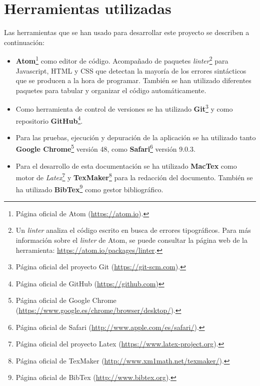 \section{Herramientas utilizadas}
\label{sec:herramientas}

Las herramientas que se han usado para desarrollar este proyecto se describen a continuación:

\begin{itemize}
	\item \textbf{Atom}\footnote{Página oficial de Atom (\url{https://atom.io}).} como editor de código. Acompañado de paquetes \emph{linter}\footnote{Un \emph{linter} analiza el código escrito en busca de errores tipográficos. Para más información sobre el \emph{linter} de Atom, se puede consultar la página web de la herramienta: \url{https://atom.io/packages/linter}.} para Javascript, HTML y CSS que detectan la mayoría de los errores sintácticos que se producen a la hora de programar. También se han utilizado diferentes paquetes para tabular y organizar el código automáticamente. 

	\item Como herramienta de control de versiones se ha utilizado \textbf{Git}\footnote{Página oficial del proyecto Git (\url{https://git-scm.com}).} y como repositorio \textbf{GitHub}\footnote{Página oficial de GitHub (\url{https://github.com})}.
	
	\item Para las pruebas, ejecución y depuración de la aplicación se ha utilizado tanto \textbf{Google Chrome}\footnote{Página oficial de Google Chrome (\url{https://www.google.es/chrome/browser/desktop/}).} versión 48, como \textbf{Safari}\footnote{Página oficial de Safari (\url{http://www.apple.com/es/safari/}).} versión 9.0.3.
	
	\item Para el desarrollo de esta documentación se ha utilizado \textbf{MacTex} como motor de \emph{Latex}\footnote{Página oficial del proyecto Latex (\url{https://www.latex-project.org}).} y \textbf{TexMaker}\footnote{Página oficial de TexMaker (\url{http://www.xm1math.net/texmaker/}).} para la redacción del documento. También se ha utilizado \textbf{BibTex}\footnote{Página oficial de BibTex (\url{http://www.bibtex.org}).} como gestor bibliográfico.
\end{itemize}




